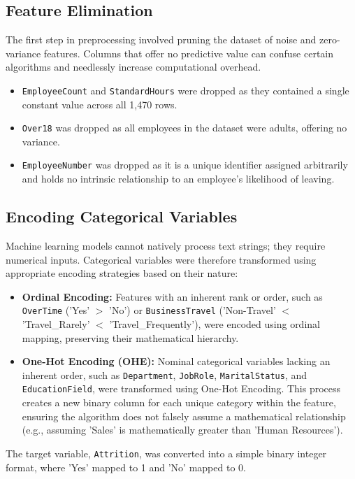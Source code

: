 \subsection{Feature Elimination}
The first step in preprocessing involved pruning the dataset of noise and zero-variance features. Columns that offer no predictive value can confuse certain algorithms and needlessly increase computational overhead.
\begin{itemize}
    \item \texttt{EmployeeCount} and \texttt{StandardHours} were dropped as they contained a single constant value across all 1,470 rows.
    \item \texttt{Over18} was dropped as all employees in the dataset were adults, offering no variance.
    \item \texttt{EmployeeNumber} was dropped as it is a unique identifier assigned arbitrarily and holds no intrinsic relationship to an employee's likelihood of leaving.
\end{itemize}

\subsection{Encoding Categorical Variables}
Machine learning models cannot natively process text strings; they require numerical inputs. Categorical variables were therefore transformed using appropriate encoding strategies based on their nature:
\begin{itemize}
    \item \textbf{Ordinal Encoding:} Features with an inherent rank or order, such as \texttt{OverTime} ('Yes' $>$ 'No') or \texttt{BusinessTravel} ('Non-Travel' $<$ 'Travel\_Rarely' $<$ 'Travel\_Frequently'), were encoded using ordinal mapping, preserving their mathematical hierarchy.
    \item \textbf{One-Hot Encoding (OHE):} Nominal categorical variables lacking an inherent order, such as \texttt{Department}, \texttt{JobRole}, \texttt{MaritalStatus}, and \texttt{EducationField}, were transformed using One-Hot Encoding. This process creates a new binary column for each unique category within the feature, ensuring the algorithm does not falsely assume a mathematical relationship (e.g., assuming 'Sales' is mathematically greater than 'Human Resources').
\end{itemize}
The target variable, \texttt{Attrition}, was converted into a simple binary integer format, where 'Yes' mapped to 1 and 'No' mapped to 0.

